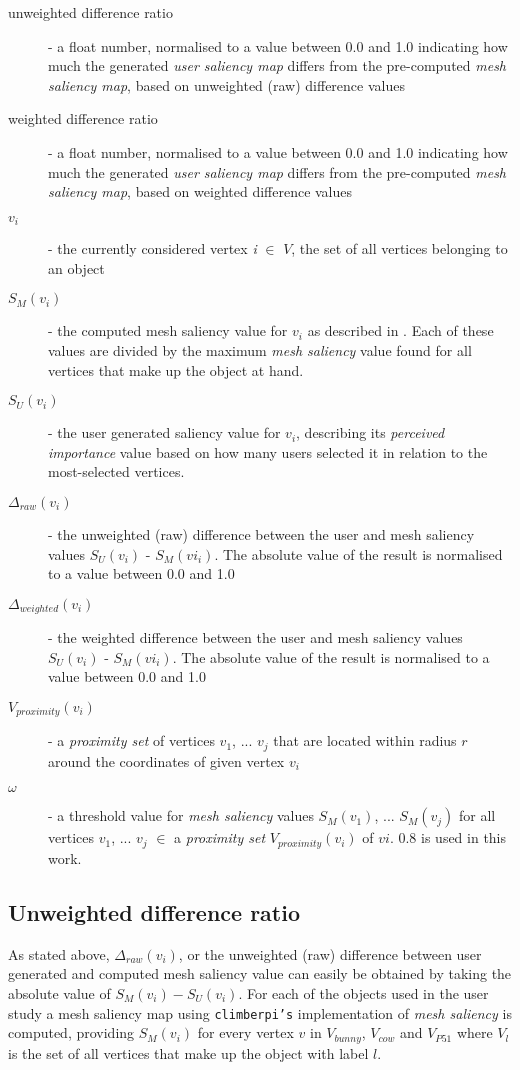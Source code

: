 \begin{description}
	\item[unweighted difference ratio] - a float number, normalised to a value between 0.0 and 1.0 indicating how much the generated \textit{user saliency map} differs from the pre-computed \textit{mesh saliency map}, based on unweighted (raw) difference values
	\item[weighted difference ratio] - a float number, normalised to a value between 0.0 and 1.0 indicating how much the generated \textit{user saliency map} differs from the pre-computed \textit{mesh saliency map}, based on weighted difference values
	\item[$v_i$] - the currently considered vertex \textit{i} $\in$ $V$, the set of all vertices belonging to an object
	\item[$S_{M}(v_i)$] - the computed mesh saliency value for $v_i$ as described in \cite{lee2005mesh}. Each of these values are divided by the maximum \textit{mesh saliency} value found for all vertices that make up the object at hand.
	\item[$S_{U}(v_i)$] - the user generated saliency value for $v_i$, describing its \textit{perceived importance} value based on how many users selected it in relation to the most-selected vertices.
	\item[$\Delta_{raw}(v_i)$] - the unweighted (raw) difference between the user and mesh saliency values $S_{U}(v_i)$ - $S_{M}(vi_i)$. The absolute value of the result is normalised to a value between 0.0 and 1.0
	\item[$\Delta_{weighted}(v_i)$] - the weighted difference between the user and mesh saliency values $S_{U}(v_i)$ - $S_{M}(vi_i)$. The absolute value of the result is normalised to a value between 0.0 and 1.0
	\item[$V_{proximity}(v_i)$] - a \textit{proximity set} of vertices $v_1$, ... $v_j$ that are located within radius $r$ around the coordinates of given vertex $v_i$
	\item[$\omega$] - a threshold value for \textit{mesh saliency} values $S_{M}(v_1)$, ... $S_{M}(v_j)$ for all vertices $v_1$, ... $v_j$ $\in$ a \textit{proximity set} $V_{proximity}(v_i)$ of $vi$. $0.8$ is used in this work.
\end{description}

		\subsection{Unweighted difference ratio}
		\label{sec:unweighted_difference_ratio}
As stated above, $\Delta_{raw}(v_i)$, or the unweighted (raw) difference between user generated and computed mesh saliency value can easily be obtained by taking the absolute value of $S_{M}(v_i) - S_{U}(v_i)$. For each of the objects used in the user study a mesh saliency map using \texttt{climberpi's} implementation of \textit{mesh saliency} \cite{clms} is computed, providing $S_{M}(v_i)$ for every vertex $v$ in $V_{bunny}$, $V_{cow}$ and $V_{P51}$ where $V_{l}$ is the set of all vertices that make up the object with label $l$.

